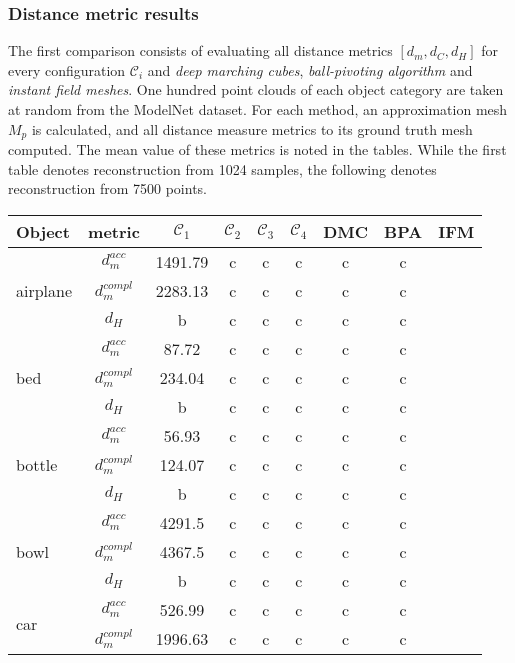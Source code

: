 \subsubsection*{Distance metric results}
    The first comparison consists of evaluating all distance metrics $[d_m, d_C, d_H]$ for every configuration
    $\mathcal{C}_i$ and \emph{deep marching cubes}, \emph{ball-pivoting algorithm} and \emph{instant field meshes}.
    One hundred point clouds of each object category are taken at random from the ModelNet dataset. For each method,
    an approximation mesh $M_{p}$ is calculated, and all distance measure metrics to its ground truth mesh computed.
    The mean value of these metrics is noted in the tables. While the first table denotes reconstruction from 1024 
    samples, the following denotes reconstruction from 7500 points.
\begin{center}
     \label{tab:distance1024} 
    \begin{tabular}{| l | c | c | c | c | c | c | c | c |}
        \hline
        Object& metric& $\mathcal{C}_1$ & $\mathcal{C}_2$ & $\mathcal{C}_3$ & $\mathcal{C}_4$ & DMC & BPA & IFM \\ \hline
        \multirow{3}{*}{airplane}&$d_m^{acc}$&1491.79&c&c&c&c&c&\\
        &$d_m^{compl}$&2283.13&c&c&c&c&c&\\
        &$d_H$&b&c&c&c&c&c&\\
        \hline
        \multirow{3}{*}{bed}&$d_m^{acc}$&87.72&c&c&c&c&c&\\
        &$d_m^{compl}$&234.04&c&c&c&c&c&\\
        &$d_H$&b&c&c&c&c&c&\\
        \hline
        \multirow{3}{*}{bottle}&$d_m^{acc}$&56.93&c&c&c&c&c&\\
        &$d_m^{compl}$&124.07&c&c&c&c&c&\\
        &$d_H$&b&c&c&c&c&c&\\
        \hline
        \multirow{3}{*}{bowl}&$d_m^{acc}$&4291.5&c&c&c&c&c&\\
        &$d_m^{compl}$&4367.5&c&c&c&c&c&\\
        &$d_H$&b&c&c&c&c&c&\\
        \hline
        \multirow{3}{*}{car}&$d_m^{acc}$&526.99&c&c&c&c&c&\\
        &$d_m^{compl}$&1996.63&c&c&c&c&c&\\

\end{tabular}
\end{center}
